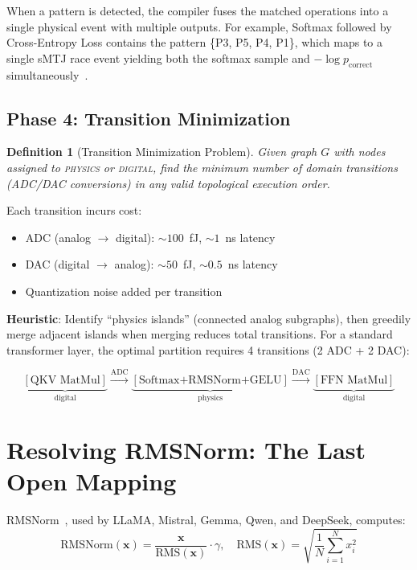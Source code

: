 \documentclass[11pt]{article}
\newtheorem{definition}{Definition}
\begin{document}
When a pattern is detected, the compiler fuses the matched operations into a single physical event with multiple outputs. For example, Softmax followed by Cross-Entropy Loss contains the pattern \{P3, P5, P4, P1\}, which maps to a single sMTJ race event yielding both the softmax sample and $-\log p_{\text{correct}}$ simultaneously~\cite{bieg2026}.

\subsection{Phase 4: Transition Minimization}

\begin{definition}[Transition Minimization Problem]
Given graph $G$ with nodes assigned to \textsc{physics} or \textsc{digital}, find the minimum number of domain transitions (ADC/DAC conversions) in any valid topological execution order.
\end{definition}

Each transition incurs cost:
\begin{itemize}[leftmargin=*]
\item ADC (analog $\to$ digital): ${\sim}100$~fJ, ${\sim}1$~ns latency
\item DAC (digital $\to$ analog): ${\sim}50$~fJ, ${\sim}0.5$~ns latency
\item Quantization noise added per transition
\end{itemize}

\textbf{Heuristic}: Identify ``physics islands'' (connected analog subgraphs), then greedily merge adjacent islands when merging reduces total transitions. For a standard transformer layer, the optimal partition requires 4 transitions (2 ADC + 2 DAC):

\begin{equation*}
\underbrace{[\text{QKV MatMul}]}_{\text{digital}} \!\xrightarrow{\text{ADC}}\! \underbrace{[\text{Softmax+RMSNorm+GELU}]}_{\text{physics}} \!\xrightarrow{\text{DAC}}\! \underbrace{[\text{FFN MatMul}]}_{\text{digital}}
\end{equation*}

\section{Resolving RMSNorm: The Last Open Mapping}
\label{sec:rmsnorm}

RMSNorm~\cite{zhang_rmsnorm2019}, used by LLaMA, Mistral, Gemma, Qwen, and DeepSeek, computes:
\begin{equation}
\text{RMSNorm}(\mathbf{x}) = \frac{\mathbf{x}}{\text{RMS}(\mathbf{x})} \cdot \gamma, \quad \text{RMS}(\mathbf{x}) = \sqrt{\frac{1}{N}\sum_{i=1}^{N} x_i^2}
\end{equation}
\end{document}
